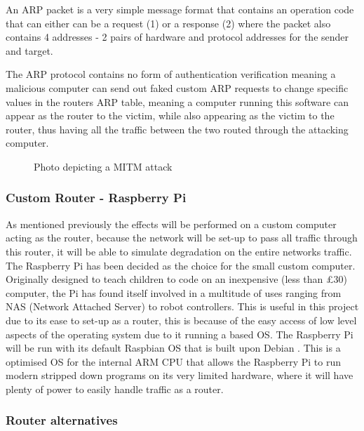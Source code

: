 An ARP packet is a very simple message format that contains an operation code that can either can be a request (1) or a response (2) where the packet also contains 4 addresses - 2 pairs of hardware and protocol addresses for the sender and target.

The ARP protocol contains no form of authentication verification meaning a malicious computer can send out faked custom ARP requests to change specific values in the routers ARP table, meaning a computer running this software can appear as the router to the victim, while also appearing as the victim to the router, thus having all the traffic between the two routed through the attacking computer. 

\begin{center}

	\begin{figure}[h]
		\caption{Photo depicting a MITM attack}
	\end{figure}
\end{center}

\subsubsection{Custom Router - Raspberry Pi}
As mentioned previously the effects will be performed on a custom computer acting as the router, because the network will be set-up to pass all traffic through this router, it will be able to simulate degradation on the entire networks traffic.
The Raspberry Pi \citep{upton2014raspberry} has been decided as the choice for the small custom computer. Originally designed to teach children to code on an inexpensive (less than £30) computer, the Pi has found itself involved in a multitude of uses ranging from NAS (Network Attached Server) to robot controllers. This is useful in this project due to its ease to set-up as a router, this is because of the easy access of low level aspects of the operating system due to it running a based OS. The Raspberry Pi will be run with its default Raspbian OS \citep{pi2014raspbian} that is built upon Debian \citep{murdock1994overview}. This is a optimised OS for the internal ARM CPU that allows the Raspberry Pi to run modern stripped down programs on its very limited hardware, where it will have plenty of power to easily handle traffic as a router.

\subsubsection{Router alternatives}

